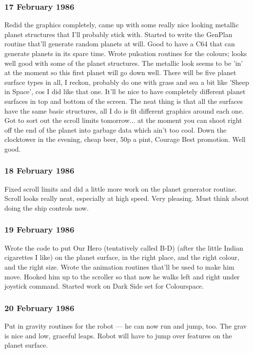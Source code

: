 \subsubsection{17 February 1986}
Redid the graphics completely, came up with some really nice looking metallic planet structures that I'll probably stick with. Started to write the GenPlan routine that'll generate random planets at will. Good to have a C64 that can generate planets in its spare time. Wrote pulsation routines for the colours; looks well good with some of the planet structures. The metallic look seems to be 'in' at the moment so this first planet will go down well. There will be five planet surface types in all, I reckon, probably do one with grass and sea a bit like 'Sheep in Space', cos I did like that one. It'll be nice to have completely different planet surfaces in top and bottom of the screen. The neat thing is that all the surfaces have the same basic structures, all I do is fit different graphics around each one. Got to sort out the scroll limits tomorrow... at the moment you can shoot right off the end of the planet into garbage data which ain't too cool. Down the clocktower in the evening, cheap beer, 50p a pint, Courage Best promotion. Well good.

\subsubsection{18 February 1986}
Fixed scroll limits and did a little more work on the planet generator routine. Scroll looks really neat, especially at high speed. Very pleasing. Must think about doing the ship controls now.

\subsubsection{19 February 1986}
Wrote the code to put Our Hero (tentatively called B-D) (after the little Indian cigarettes I like) on the planet surface, in the right place, and the right colour, and the right size. Wrote the animation routines that'll be used to make him move. Hooked him up to the scroller so that now he walks left and right under joystick command. Started work on Dark Side set for Colourspace.

\subsubsection{20 February 1986}
Put in gravity routines for the robot — he can now run and jump, too. The grav is nice and low, graceful leaps. Robot will have to jump over features on the planet surface.

